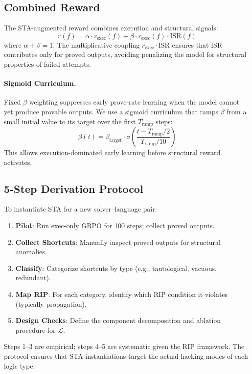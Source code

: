 \documentclass[11pt,a4paper]{article}
\begin{document}
\subsection{Combined Reward}

The STA-augmented reward combines execution and structural signals:
\begin{equation}
r(f) = \alpha \cdot r_{\text{exec}}(f) + \beta \cdot r_{\text{exec}}(f) \cdot \text{ISR}(f)
\label{eq:reward}
\end{equation}
where $\alpha + \beta = 1$. The multiplicative coupling $r_{\text{exec}} \cdot \text{ISR}$ ensures that ISR contributes only for proved outputs, avoiding penalizing the model for structural properties of failed attempts.

\paragraph{Sigmoid Curriculum.}
Fixed $\beta$ weighting suppresses early prove-rate learning when the model cannot yet produce provable outputs. We use a sigmoid curriculum that ramps $\beta$ from a small initial value to its target over the first $T_{\text{ramp}}$ steps:
\begin{equation}
\beta(t) = \beta_{\text{target}} \cdot \sigma\left(\frac{t - T_{\text{ramp}}/2}{T_{\text{ramp}}/10}\right)
\end{equation}
This allows execution-dominated early learning before structural reward activates.

\subsection{5-Step Derivation Protocol}
\label{sec:protocol}

To instantiate STA for a new solver--language pair:
\begin{enumerate}
\item \textbf{Pilot}: Run exec-only GRPO for 100 steps; collect proved outputs.
\item \textbf{Collect Shortcuts}: Manually inspect proved outputs for structural anomalies.
\item \textbf{Classify}: Categorize shortcuts by type (e.g., tautological, vacuous, redundant).
\item \textbf{Map RIP}: For each category, identify which RIP condition it violates (typically propagation).
\item \textbf{Design Checks}: Define the component decomposition and ablation procedure for $\mathcal{L}$.
\end{enumerate}
Steps 1--3 are empirical; steps 4--5 are systematic given the RIP framework. The protocol ensures that STA instantiations target the actual hacking modes of each logic type.
\end{document}
